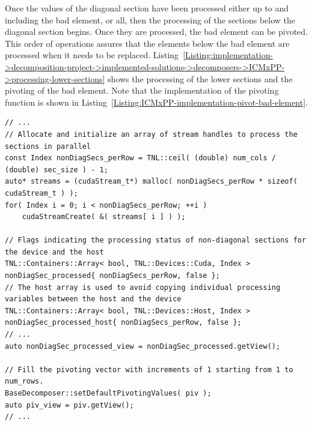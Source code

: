 Once the values of the diagonal section have been processed either up to and including the bad element, or all, then the processing of the sections below the diagonal section begins. Once they are processed, the bad element can be pivoted. This order of operations assures that the elements below the bad element are processed when it needs to be replaced. Listing~\ref{Listing:implementation->decomposition-project->implemented-solutions->decomposers->ICMxPP->processing-lower-sections} shows the processing of the lower sections and the pivoting of the bad element. Note that the implementation of the pivoting function is shown in Listing~\ref{Listing:ICMxPP-implementation-pivot-bad-element}.

\begin{lstlisting}[caption={An excerpt from the definition of the overloaded \code{decompose()} method for the ICM\_\textit{x}PP decomposer. The excerpt highlights how the processing of lower sections, i.e., sections below a diagonal section, is implemented. The \code{LSecCompute\_kernel()} and \code{NonDiagSecAssign\_kernel()} kernels compute and assign values of the lower sections, respectively. The kernels are presented separately in Listings~\ref{Listing:ICMxPP-implementation->kernels->lower-section-compute} and \ref{Listing:ICMxPP-implementation->kernels->nondiagonal-assign}.},label={Listing:implementation->decomposition-project->implemented-solutions->decomposers->ICMxPP->processing-lower-sections},escapechar=@]
// ...
// Allocate and initialize an array of stream handles to process the sections in parallel
const Index nonDiagSecs_perRow = TNL::ceil( (double) num_cols / (double) sec_size ) - 1;
auto* streams = (cudaStream_t*) malloc( nonDiagSecs_perRow * sizeof( cudaStream_t ) );
for( Index i = 0; i < nonDiagSecs_perRow; ++i )
	cudaStreamCreate( &( streams[ i ] ) );

// Flags indicating the processing status of non-diagonal sections for the device and the host
TNL::Containers::Array< bool, TNL::Devices::Cuda, Index > nonDiagSec_processed{ nonDiagSecs_perRow, false };
// The host array is used to avoid copying individual processing variables between the host and the device
TNL::Containers::Array< bool, TNL::Devices::Host, Index > nonDiagSec_processed_host{ nonDiagSecs_perRow, false };
// ...
auto nonDiagSec_processed_view = nonDiagSec_processed.getView();

// Fill the pivoting vector with increments of 1 starting from 1 to num_rows.
BaseDecomposer::setDefaultPivotingValues( piv );
auto piv_view = piv.getView();
// ...


\end{lstlisting}
